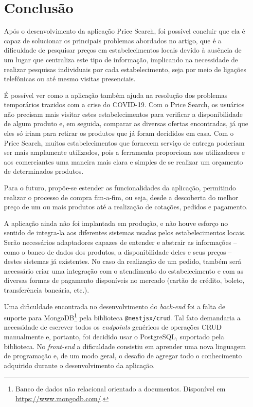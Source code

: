 \section{Conclusão}
\label{sec:conclusao}

Após o desenvolvimento da aplicação Price Search, foi possível concluir que ela é capaz de solucionar os principais problemas abordados no artigo, que é a dificuldade de pesquisar preços em estabelecimentos locais devido à ausência de um lugar que centraliza este tipo de informação, implicando na necessidade de realizar pesquisas individuais por cada estabelecimento, seja por meio de ligações telefônicas ou até mesmo visitas presenciais.

É possível ver como a aplicação também ajuda na resolução dos problemas temporários trazidos com a crise do COVID-19. Com o Price Search, os usuários não precisam mais visitar estes estabelecimentos para verificar a disponibilidade de algum produto e, em seguida, comparar as diversas ofertas encontradas, já que eles só iriam para retirar os produtos que já foram decididos em casa. Com o Price Search, muitos estabelecimentos que fornecem serviço de entrega poderiam ser mais amplamente utilizados, pois a ferramenta proporciona aos utilizadores e aos comerciantes uma maneira mais clara e simples de se realizar um orçamento de determinados produtos.

Para o futuro, propõe-se estender as funcionalidades da aplicação, permitindo realizar o processo de compra fim-a-fim, ou seja, desde a descoberta do melhor preço de um ou mais produtos até a realização de cotações, pedidos e pagamento.

A aplicação ainda não foi implantada em produção, e não houve esforço no sentido de integra-la aos diferentes sistemas usados pelos estabelecimentos locais. Serão necessários adaptadores capazes de entender e abstrair as informações -- como o banco de dados dos produtos, a disponibilidade deles e seus preços -- destes sistemas já existentes. No caso da realização de um pedido, também será necessário criar uma integração com o atendimento do estabelecimento e com as diversas formas de pagamento disponíveis no mercado (cartão de crédito, boleto, transferência bancária, etc.).

Uma dificuldade encontrada no desenvolvimento do \textit{back-end} foi a falta de suporte para MongoDB\footnote{Banco de dados não relacional orientado a documentos. Disponível em \url{https://www.mongodb.com/}.} pela biblioteca \texttt{@nestjsx/crud}. Tal fato demandaria a necessidade de escrever todos os \textit{endpoints} genéricos de operações CRUD manualmente e, portanto, foi decidido usar o PostgreSQL, suportado pela biblioteca. No \textit{front-end} a dificuldade consistiu em aprender uma nova linguagem de programação e, de um modo geral, o desafio de agregar todo o conhecimento adquirido durante o desenvolvimento da aplicação.

